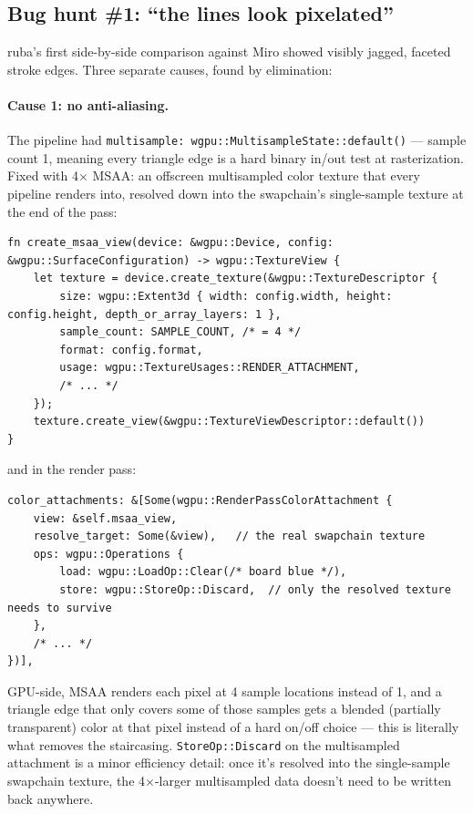 \documentclass[11pt]{article}
\begin{document}
\subsection{Bug hunt \#1: ``the lines look pixelated''}
\label{sec:bughunt1}
ruba's first side-by-side comparison against Miro showed visibly jagged, faceted stroke
edges. Three separate causes, found by elimination:

\paragraph{Cause 1: no anti-aliasing.} The pipeline had \texttt{multisample:
wgpu::MultisampleState::default()} — sample count 1, meaning every triangle edge is a hard
binary in/out test at rasterization. Fixed with 4$\times$ MSAA: an offscreen multisampled
color texture that every pipeline renders into, resolved down into the swapchain's
single-sample texture at the end of the pass:
\begin{lstlisting}
fn create_msaa_view(device: &wgpu::Device, config: &wgpu::SurfaceConfiguration) -> wgpu::TextureView {
    let texture = device.create_texture(&wgpu::TextureDescriptor {
        size: wgpu::Extent3d { width: config.width, height: config.height, depth_or_array_layers: 1 },
        sample_count: SAMPLE_COUNT, /* = 4 */
        format: config.format,
        usage: wgpu::TextureUsages::RENDER_ATTACHMENT,
        /* ... */
    });
    texture.create_view(&wgpu::TextureViewDescriptor::default())
}
\end{lstlisting}
and in the render pass:
\begin{lstlisting}
color_attachments: &[Some(wgpu::RenderPassColorAttachment {
    view: &self.msaa_view,
    resolve_target: Some(&view),   // the real swapchain texture
    ops: wgpu::Operations {
        load: wgpu::LoadOp::Clear(/* board blue */),
        store: wgpu::StoreOp::Discard,  // only the resolved texture needs to survive
    },
    /* ... */
})],
\end{lstlisting}
GPU-side, MSAA renders each pixel at 4 sample locations instead of 1, and a triangle edge
that only covers some of those samples gets a blended (partially transparent) color at
that pixel instead of a hard on/off choice — this is literally what removes the
staircasing. \texttt{StoreOp::Discard} on the multisampled attachment is a minor
efficiency detail: once it's resolved into the single-sample swapchain texture, the
4$\times$-larger multisampled data doesn't need to be written back anywhere.
\end{document}
